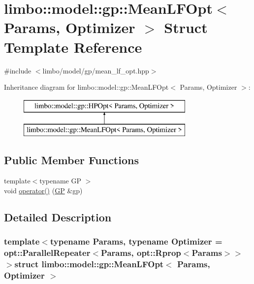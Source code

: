 \hypertarget{structlimbo_1_1model_1_1gp_1_1_mean_l_f_opt}{}\section{limbo\+:\+:model\+:\+:gp\+:\+:Mean\+L\+F\+Opt$<$ Params, Optimizer $>$ Struct Template Reference}
\label{structlimbo_1_1model_1_1gp_1_1_mean_l_f_opt}


{\ttfamily \#include $<$limbo/model/gp/mean\+\_\+lf\+\_\+opt.\+hpp$>$}

Inheritance diagram for limbo\+:\+:model\+:\+:gp\+:\+:Mean\+L\+F\+Opt$<$ Params, Optimizer $>$\+:\begin{figure}[H]
\begin{center}
\leavevmode
\includegraphics[height=2.000000cm]{structlimbo_1_1model_1_1gp_1_1_mean_l_f_opt}
\end{center}
\end{figure}
\subsection*{Public Member Functions}
\begin{DoxyCompactItemize}
\item 
{\footnotesize template$<$typename G\+P $>$ }\\void \hyperlink{structlimbo_1_1model_1_1gp_1_1_mean_l_f_opt_a3db7aa510b906aeacc851f984ceac1ca}{operator()} (\hyperlink{classlimbo_1_1model_1_1_g_p}{G\+P} \&gp)
\end{DoxyCompactItemize}


\subsection{Detailed Description}
\subsubsection*{template$<$typename Params, typename Optimizer = opt\+::\+Parallel\+Repeater$<$\+Params, opt\+::\+Rprop$<$\+Params$>$$>$$>$struct limbo\+::model\+::gp\+::\+Mean\+L\+F\+Opt$<$ Params, Optimizer $>$}

